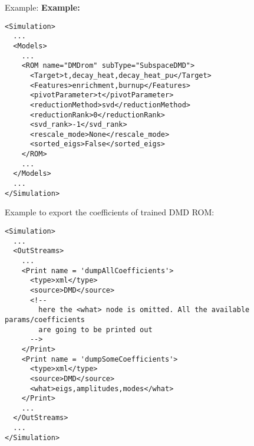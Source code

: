 \hspace{24pt}
Example:
\textbf{Example:}
\begin{lstlisting}[style=XML,morekeywords={name,subType}]
<Simulation>
  ...
  <Models>
    ...
    <ROM name="DMDrom" subType="SubspaceDMD">
      <Target>t,decay_heat,decay_heat_pu</Target>
      <Features>enrichment,burnup</Features>
      <pivotParameter>t</pivotParameter>
      <reductionMethod>svd</reductionMethod>
      <reductionRank>0</reductionRank>
      <svd_rank>-1</svd_rank>
      <rescale_mode>None</rescale_mode>
      <sorted_eigs>False</sorted_eigs>
    </ROM>
    ...
  </Models>
  ...
</Simulation>
\end{lstlisting}

Example to export the coefficients of trained DMD ROM:
\begin{lstlisting}[style=XML,morekeywords={name,subType}]
<Simulation>
  ...
  <OutStreams>
    ...
    <Print name = 'dumpAllCoefficients'>
      <type>xml</type>
      <source>DMD</source>
      <!--
        here the <what> node is omitted. All the available params/coefficients
        are going to be printed out
      -->
    </Print>
    <Print name = 'dumpSomeCoefficients'>
      <type>xml</type>
      <source>DMD</source>
      <what>eigs,amplitudes,modes</what>
    </Print>
    ...
  </OutStreams>
  ...
</Simulation>
\end{lstlisting}


